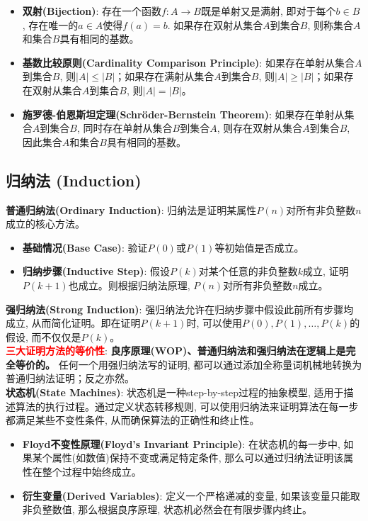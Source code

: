 \documentclass[12pt, a4paper, UTF8]{ctexart}
\newcommand{\important}[1]{\textbf{\textcolor{red}{#1}}}
\newcommand{\term}[1]{\textbf{\textcolor{blue!80!black}{#1}}}
\newcommand{\emphb}[1]{\textbf{#1}}
\begin{document}
\begin{sloppypar}
\begin{itemize}[nosep]
        \item \term{双射(Bijection)}: 存在一个函数$f: A \to B$既是单射又是满射, 即对于每个$b \in B$, 存在唯一的$a \in A$使得$f(a) = b$. 如果存在双射从集合$A$到集合$B$, 则称集合$A$和集合$B$具有相同的基数。
        \item \term{基数比较原则(Cardinality Comparison Principle)}: 如果存在单射从集合$A$到集合$B$, 则$|A| \leq |B|$；如果存在满射从集合$A$到集合$B$, 则$|A| \geq |B|$；如果存在双射从集合$A$到集合$B$, 则$|A| = |B|$。
        \item \term{施罗德-伯恩斯坦定理(Schröder-Bernstein Theorem)}: 如果存在单射从集合$A$到集合$B$, 同时存在单射从集合$B$到集合$A$, 则存在双射从集合$A$到集合$B$, 因此集合$A$和集合$B$具有相同的基数。
    \end{itemize}

    \subsection{归纳法 (Induction)}
    \emphb{普通归纳法(Ordinary Induction)}: 归纳法是证明某属性$P(n)$对所有非负整数$n$成立的核心方法。
    \begin{itemize}[nosep]
        \item \emphb{基础情况(Base Case)}: 验证$P(0)$或$P(1)$等初始值是否成立。
        \item \emphb{归纳步骤(Inductive Step)}: 假设$P(k)$对某个任意的非负整数$k$成立, 证明$P(k+1)$也成立。则根据归纳法原理, $P(n)$对所有非负整数$n$成立。
    \end{itemize}
    \emphb{强归纳法(Strong Induction)}: 强归纳法允许在归纳步骤中假设此前所有步骤均成立, 从而简化证明。即在证明$P(k+1)$时, 可以使用$P(0), P(1), \ldots, P(k)$的假设, 而不仅仅是$P(k)$。\\
    \important{三大证明方法的等价性}: \emphb{良序原理(WOP)、普通归纳法和强归纳法在逻辑上是完全等价的。} 任何一个用强归纳法写的证明, 都可以通过添加全称量词机械地转换为普通归纳法证明；反之亦然。\\
    \emphb{状态机(State Machines)}: 状态机是一种step-by-step过程的抽象模型, 适用于描述算法的执行过程。通过定义状态转移规则, 可以使用归纳法来证明算法在每一步都满足某些不变性条件, 从而确保算法的正确性和终止性。
    \begin{itemize}[nosep]
        \item \term{Floyd不变性原理(Floyd's Invariant Principle)}: 在状态机的每一步中, 如果某个属性(如数值)保持不变或满足特定条件, 那么可以通过归纳法证明该属性在整个过程中始终成立。
        \item \term{衍生变量(Derived Variables)}: 定义一个严格递减的变量, 如果该变量只能取非负整数值, 那么根据良序原理, 状态机必然会在有限步骤内终止。
    \end{itemize}


\end{sloppypar}
\end{document}
